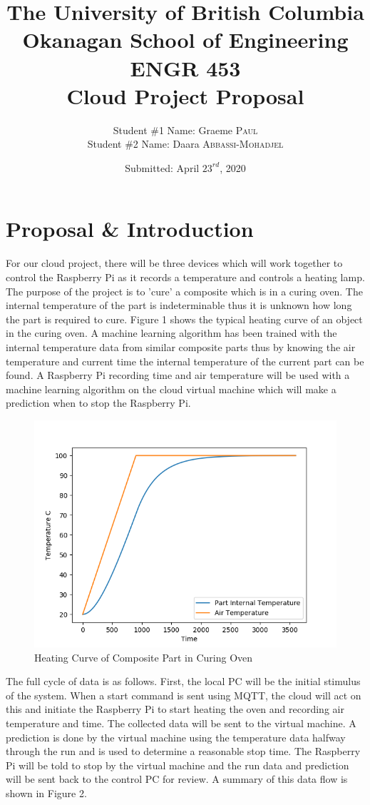 \documentclass{article}
\title{The University of British Columbia Okanagan
School of Engineering \\ \vspace{1cm} ENGR 453 \\
Cloud Project Proposal \vspace{2cm}} %
\date{Submitted: April \(23^{rd}\), 2020  \vspace{2cm}} %
\author{Student \#1 Name: Graeme \textsc{Paul}\\
Student \#2 Name: Daara \textsc{Abbassi-Mohadjel}} %
\begin{document}
\maketitle

\clearpage
\section{Proposal \& Introduction}
For our cloud project, there will be three devices which will work together to control the Raspberry Pi as it records a temperature and controls a heating lamp. The purpose of the project is to 'cure' a composite which is in a curing oven. The internal temperature of the part is indeterminable thus it is unknown how long the part is required to cure. Figure 1 shows the typical heating curve of an object in the curing oven. A machine learning algorithm has been trained with the internal temperature data from similar composite parts thus by knowing the air temperature and current time the internal temperature of the current part can be found. A Raspberry Pi recording time and air temperature will be used with a machine learning algorithm on the cloud virtual machine which will make a prediction when to stop the Raspberry Pi.
\begin{figure}[h]
    \centering
    \includegraphics[width=.5\textwidth]{Figure_1.png}
    \caption{Heating Curve of Composite Part in Curing Oven}
    \label{fig:curveplot}
\end{figure}
\newpage
The full cycle of data is as follows. First, the local PC will be the initial stimulus of the system. When a start command is sent using MQTT, the cloud will act on this and initiate the Raspberry Pi to start heating the oven and recording air temperature and time. The collected data will be sent to the virtual machine. A prediction is done by the virtual machine using the temperature data halfway through the run and is used to determine a reasonable stop time. The Raspberry Pi will be told to stop by the virtual machine and the run data and prediction will be sent back to the control PC for review. A summary of this data flow is shown in Figure 2.
\end{document}
